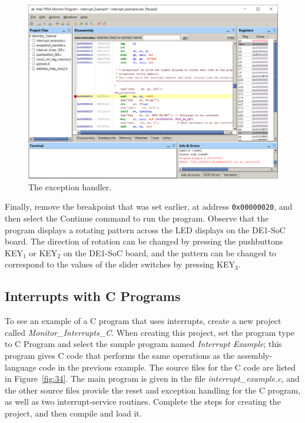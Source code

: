\documentclass[11pt, twoside, pdftex]{article}
\begin{document}
\begin{figure}[H]
   \begin{center}
      \includegraphics[scale=0.6]{screenshots/figure33.png}
   \end{center}
   \caption{The exception handler.} 
	 \label{fig:33}
\end{figure}

Finally, remove the breakpoint that was set earlier, at address
\texttt{0x00000020}, and then select the \textsf{Continue}
command to run the program. Observe that the program displays a
rotating pattern across the LED displays on the DE1-SoC board.
The direction of rotation can be changed by pressing the
pushbuttons KEY$_1$ or KEY$_2$ on the DE1-SoC board, and the
pattern can be changed to correspond to the
values of the slider switches by pressing KEY$_3$.  

\subsection{Interrupts with C Programs}

To see an example of a C program that uses interrupts, create a
new project called {\it Monitor\_Interrupts\_C}.
When creating this project, set the program type to 
{\sf C Program} and select the sample program named 
{\it Interrupt Example}; this program gives C code that performs
the same operations as the assembly-language code in the previous
example. The source files for the C code are listed in 
Figure~\ref{fig:34}. The main program is given in the file 
{\it interrupt\_example.c}, and the other source files provide
the reset and exception handling for the C program, as well as
two interrupt-service routines.  Complete the steps for creating
the project, and then compile and load it.
\end{document}
